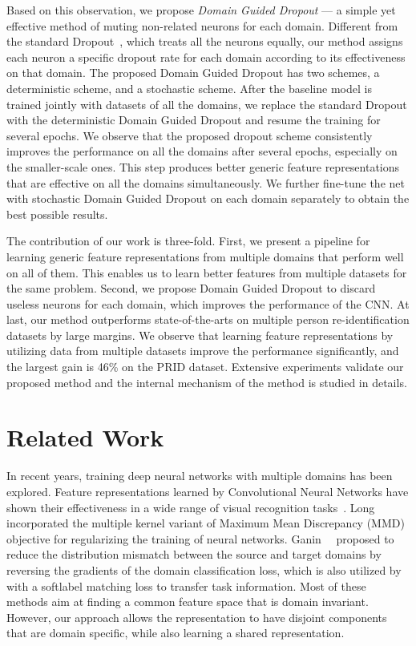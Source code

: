 Based on this observation, we propose \emph{Domain Guided Dropout} --- a simple yet effective method of muting non-related neurons for each domain. Different from the standard Dropout~\cite{hinton2012improving}, which treats all the neurons equally, our method assigns each neuron a specific dropout rate for each domain according to its effectiveness on that domain. The proposed Domain Guided Dropout has two schemes, a deterministic scheme, and a stochastic scheme. After the baseline model is trained jointly with datasets of all the domains, we replace the standard Dropout with the deterministic Domain Guided Dropout and resume the training for several epochs. We observe that the proposed dropout scheme consistently improves the performance on all the domains after several epochs, especially on the smaller-scale ones. This step produces better generic feature representations that are effective on all the domains simultaneously. We further fine-tune the net with stochastic Domain Guided Dropout on each domain separately to obtain the best possible results.

The contribution of our work is three-fold. First, we present a pipeline for learning generic feature representations from multiple domains that perform well on all of them. This enables us to learn better features from multiple datasets for the same problem. Second, we propose Domain Guided Dropout to discard useless neurons for each domain, which improves the performance of the CNN. At last, our method outperforms state-of-the-arts on multiple person re-identification datasets by large margins. We observe that learning feature representations by utilizing data from multiple datasets improve the performance significantly, and the largest gain is 46\% on the PRID dataset. Extensive experiments validate our proposed method and the internal mechanism of the method is studied in details.



\section{Related Work} %
\label{sec:md-related_work}

In recent years, training deep neural networks with multiple domains has been explored. Feature representations learned by Convolutional Neural Networks have shown their effectiveness in a wide range of visual recognition tasks~\cite{krizhevsky2012imagenet,girshick2014rich,long2014fully,chu2016structured,yang2016end,kang2016object}. Long~\etal~\cite{long2015learning} incorporated the multiple kernel variant of Maximum Mean Discrepancy (MMD) objective for regularizing the training of neural networks. Ganin~\etal~\cite{ganin2014unsupervised} proposed to reduce the distribution mismatch between the source and target domains by reversing the gradients of the domain classification loss, which is also utilized by~\cite{tzeng2015simultaneous} with a softlabel matching loss to transfer task information. Most of these methods aim at finding a common feature space that is domain invariant. However, our approach allows the representation to have disjoint components that are domain specific, while also learning a shared representation.

